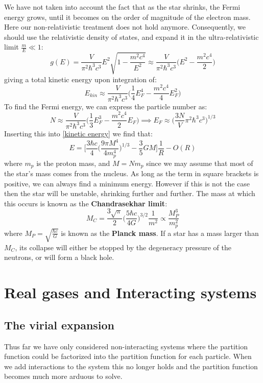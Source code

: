 \documentclass[a4paper,11pt,oneside]{book}
\begin{document}
We have not taken into account the fact that as the star shrinks, the Fermi energy grows, until it becomes on the order of magnitude of the electron mass. Here our non-relativistic treatment does not hold anymore. Consequently, we should use the relativistic density of states, and expand it in the ultra-relativistic limit $\frac{m}{E}\ll1$:
\begin{equation}
    g(E) = \frac{V}{\pi^2 \hbar^3 c^3} E^2 \sqrt{1-\frac{m^2 c^4}{E^2}} \approx \frac{V}{\pi^2 \hbar^3 c^3}\bigg(E^2 - \frac{m^2c^4}{2})
\end{equation}
giving a total kinetic energy upon integration of:
\begin{equation}\label{kinetic energy}
    E_{kin} \approx \frac{V}{\pi^2 \hbar^3 c^3}\bigg(\frac{1}{4}E_F^4 - \frac{m^2c^4}{4}E_F^2\bigg)
\end{equation}
To find the Fermi energy, we can express the particle number as:
\begin{equation}
    N \approx \frac{V}{\pi^2 \hbar^3 c^3}\bigg(\frac{1}{3}E_F^3 - \frac{m^2c^4}{2}E_F\bigg) \implies E_F \approx \bigg(\frac{3N}{V}\pi^2 \hbar^3 c^3\bigg)^{1/3}
\end{equation}
Inserting this into \eqref{kinetic energy} we find that:
\begin{equation}
    E = \bigg[\frac{3\hbar c}{4}\bigg(\frac{9\pi M^4}{4m_p^4}\bigg)^{1/3} - \frac{3}{5}GM\bigg] \frac{1}{R} -O(R)
\end{equation}
where $m_p$ is the proton mass, and $M=Nm_p$ since we may assume that most of the star's mass comes from the nucleus. As long as the term in square brackets is positive, we can always find a minimum energy. However if this is not the case then the star will be unstable, shrinking further and further. The mass at which this occurs is known as the \textbf{Chandrasekhar limit}:
\begin{equation}
    M_C = \frac{3\sqrt{\pi}}{2}\bigg(\frac{5\hbar c}{4G}\bigg)^{3/2}\frac{1}{m^2} \propto \frac{M_P^3}{m_p^2}
\end{equation}
where $M_P = \sqrt{\frac{\hbar c}{G}}$ is known as the \textbf{Planck mass}. If a star has a mass larger than $M_C$, its collapse will either be stopped by the degeneracy pressure of the neutrons, or will form a black hole.
\chapter{Real gases and Interacting systems}
\section{The virial expansion}
Thus far we have only considered non-interacting systems where the partition function could be factorized into the partition function for each particle. When we add interactions to the system this no longer holds and the partition function becomes much more arduous to solve. 
\end{document}
